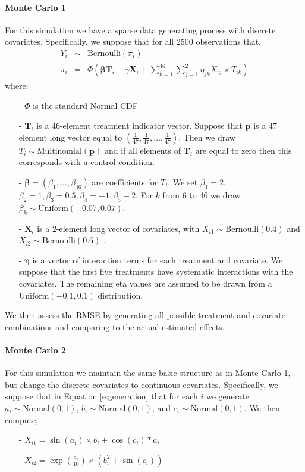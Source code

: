 \documentclass[12pt,letterpaper]{article}
\numberwithin{equation}{section}
\numberwithin{equation}{section}
\begin{document}
\paragraph{Monte Carlo 1} For this simulation we have a sparse data generating process with discrete covariates.  Specifically, we suppose that for all 2500 observations that, 
\begin{eqnarray}
Y_{i} & \sim & \text{Bernoulli} (\pi_{i} ) \nonumber \\
\pi_{i} & = & \Phi\left(\boldsymbol{\beta} \boldsymbol{T}_{i}  + \gamma \boldsymbol{X}_{i} + \sum_{k=1}^{46}\sum_{j=1}^{2}\eta_{jk} X_{ij}\times T_{ik} \right)
\label{e:generation}
\end{eqnarray}
where:
\begin{itemize}
\item[-] $\Phi$ is the standard Normal CDF
\item[-] $\boldsymbol{T}_{i}$ is a 46-element treatment indicator vector.  Suppose that $\boldsymbol{p}$ is a 47 element long vector  equal to $(\frac{1}{47}, \frac{1}{47}, \hdots, \frac{1}{47})$.  Then we draw $T_{i} \sim \text{Multinomial}(\boldsymbol{p})$ and if all elements of $\boldsymbol{T}_{i}$ are equal to zero then this corresponds with a control condition.  
\item[-] $\boldsymbol{\beta} = (\beta_{1}, \hdots, \beta_{46})$ are coefficients for $T_{i}$. We set $\beta_1 = 2$, $\beta_{2} = 1, \beta_{3} = 0.5, \beta_{4}  = -1, \beta_{5} -2$.  For $k$ from 6 to 46 we draw $\beta_{k} \sim \text{Uniform}(-0.07, 0.07)$.  
\item[-] $\boldsymbol{X}_{i}$ is a 2-element long vector of covariates, with $X_{i1} \sim \text{Bernoulli}(0.4)$ and $X_{i2} \sim \text{Bernoulli}(0.6)$ .  
\item[-] $\boldsymbol{\eta}$ is a vector of interaction terms for each treatment and covariate.  We suppose that the first five treatments have systematic interactions with the covariates. The remaining eta values are assumed to be drawn from a $\text{Uniform}(-0.1, 0.1)$ distribution.  
\end{itemize}

We then assess the RMSE by generating all possible treatment and covariate combinations and comparing to the actual estimated effects.  


\paragraph{Monte Carlo 2} For this simulation we maintain the same basic structure as in Monte Carlo 1, but change the discrete covariates to continuous covariates.  Specifically, we suppose that in Equation \ref{e:generation} that for each $i$ we generate $a_{i} \sim \text{Normal}(0,1)$, $b_{i} \sim \text{Normal}(0,1)$, and $c_{i} \sim \text{Normal}(0,1)$.  We then compute, 
\begin{itemize}
\item[-] $X_{i1} = \sin(a_{i}) \times b_{i} + \cos(c_{i})*a_{i} $
\item[-] $X_{i2}  = \exp\left(\frac{a_{i}}{10}\right)\times (b_{i}^2 + \sin(c_{i}) ) $
\end{itemize}
\end{document}
